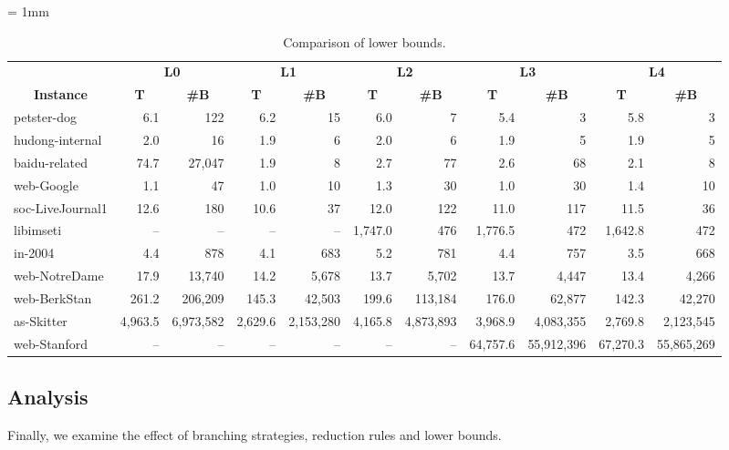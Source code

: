 \documentclass[11pt]{article}
\begin{document}
{
\tabcolsep = 1mm
\begin{table}[p!]
\center
\caption{Comparison of lower bounds.}
\label{tbl:lower_bounds}
\fontsize{8pt}{0pt}\selectfont
\begin{tabular*}{\columnwidth}{@{\extracolsep{\fill}}l|rr|rr|rr|rr|rr}
\toprule
& \multicolumn{2}{c|}{\textbf{L0}}
& \multicolumn{2}{c|}{\textbf{L1}}
& \multicolumn{2}{c|}{\textbf{L2}}
& \multicolumn{2}{c|}{\textbf{L3}}
& \multicolumn{2}{c}{\textbf{L4}} \\
\multicolumn{1}{c|}{\textbf{Instance}} &
\multicolumn{1}{c}{\textbf{T}} & \multicolumn{1}{c|}{\textbf{\#B}} &
\multicolumn{1}{c}{\textbf{T}} & \multicolumn{1}{c|}{\textbf{\#B}} &
\multicolumn{1}{c}{\textbf{T}} & \multicolumn{1}{c|}{\textbf{\#B}} &
\multicolumn{1}{c}{\textbf{T}} & \multicolumn{1}{c|}{\textbf{\#B}} &
\multicolumn{1}{c}{\textbf{T}} & \multicolumn{1}{c}{\textbf{\#B}} \\
\midrule
petster-dog & 6.1 & 122 & 6.2 & 15 & 6.0 & 7 & 5.4 & 3 & 5.8 & 3 \\
hudong-internal & 2.0 & 16 & 1.9 & 6 & 2.0 & 6 & 1.9 & 5 & 1.9 & 5 \\
baidu-related & 74.7 & 27,047 & 1.9 & 8 & 2.7 & 77 & 2.6 & 68 & 2.1 & 8 \\
web-Google & 1.1 & 47 & 1.0 & 10 & 1.3 & 30 & 1.0 & 30 & 1.4 & 10 \\
soc-LiveJournal1 & 12.6 & 180 & 10.6 & 37 & 12.0 & 122 & 11.0 & 117 & 11.5 & 36 \\
libimseti & -- & -- & -- & -- & 1,747.0 & 476 & 1,776.5 & 472 & 1,642.8 & 472 \\
in-2004 & 4.4 & 878 & 4.1 & 683 & 5.2 & 781 & 4.4 & 757 & 3.5 & 668 \\
web-NotreDame & 17.9 & 13,740 & 14.2 & 5,678 & 13.7 & 5,702 & 13.7 & 4,447 & 13.4 & 4,266 \\
web-BerkStan & 261.2 & 206,209 & 145.3 & 42,503 & 199.6 & 113,184 & 176.0 & 62,877 & 142.3 & 42,270 \\
as-Skitter & 4,963.5 & 6,973,582 & 2,629.6 & 2,153,280 & 4,165.8 & 4,873,893 & 3,968.9 & 4,083,355 & 2,769.8 & 2,123,545 \\
web-Stanford & -- & -- & -- & -- & -- & -- & 64,757.6 & 55,912,396 & 67,270.3 & 55,865,269 \\
\bottomrule
\end{tabular*}
\end{table}
}
 


\subsection{Analysis}
Finally, we examine the effect of
branching strategies, reduction rules and lower bounds.
\end{document}
